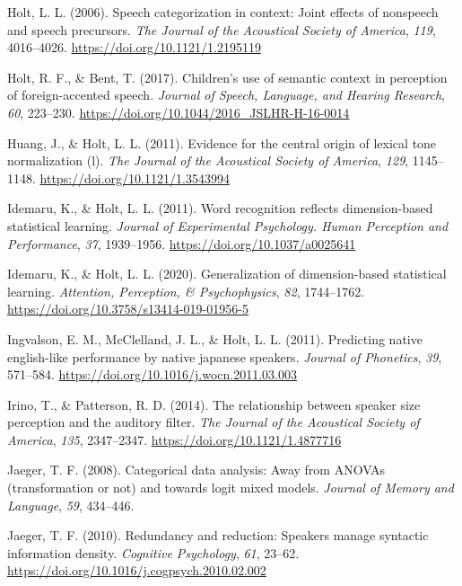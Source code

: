 \documentclass[
  11pt,
  english,
  man,floatsintext]{apa6}
\newlength{\cslhangindent}
\newlength{\cslentryspacingunit} %
\newenvironment{CSLReferences}[2] %
 {%
  \setlength{\parindent}{0pt}
  \ifodd #1
  \let\oldpar\par
  \def\par{\hangindent=\cslhangindent\oldpar}
  \fi
  \setlength{\parskip}{#2\cslentryspacingunit}
 }%
 {}
\begin{document}
\begin{CSLReferences}{1}{0}
\leavevmode{}%
Holt, L. L. (2006). Speech categorization in context: Joint effects of nonspeech and speech precursors. \emph{The Journal of the Acoustical Society of America}, \emph{119}, 4016--4026. \url{https://doi.org/10.1121/1.2195119}

\leavevmode{}%
Holt, R. F., \& Bent, T. (2017). Children's use of semantic context in perception of foreign-accented speech. \emph{Journal of Speech, Language, and Hearing Research}, \emph{60}, 223--230. \url{https://doi.org/10.1044/2016_JSLHR-H-16-0014}

\leavevmode{}%
Huang, J., \& Holt, L. L. (2011). Evidence for the central origin of lexical tone normalization (l). \emph{The Journal of the Acoustical Society of America}, \emph{129}, 1145--1148. \url{https://doi.org/10.1121/1.3543994}

\leavevmode{}%
Idemaru, K., \& Holt, L. L. (2011). Word recognition reflects dimension-based statistical learning. \emph{Journal of Experimental Psychology. Human Perception and Performance}, \emph{37}, 1939--1956. \url{https://doi.org/10.1037/a0025641}

\leavevmode{}%
Idemaru, K., \& Holt, L. L. (2020). Generalization of dimension-based statistical learning. \emph{Attention, Perception, \& Psychophysics}, \emph{82}, 1744--1762. \url{https://doi.org/10.3758/s13414-019-01956-5}

\leavevmode{}%
Ingvalson, E. M., McClelland, J. L., \& Holt, L. L. (2011). Predicting native english-like performance by native japanese speakers. \emph{Journal of Phonetics}, \emph{39}, 571--584. \url{https://doi.org/10.1016/j.wocn.2011.03.003}

\leavevmode{}%
Irino, T., \& Patterson, R. D. (2014). The relationship between speaker size perception and the auditory filter. \emph{The Journal of the Acoustical Society of America}, \emph{135}, 2347--2347. \url{https://doi.org/10.1121/1.4877716}

\leavevmode{}%
Jaeger, T. F. (2008). Categorical data analysis: Away from ANOVAs (transformation or not) and towards logit mixed models. \emph{Journal of Memory and Language}, \emph{59}, 434--446.

\leavevmode{}%
Jaeger, T. F. (2010). Redundancy and reduction: Speakers manage syntactic information density. \emph{Cognitive Psychology}, \emph{61}, 23--62. \url{https://doi.org/10.1016/j.cogpsych.2010.02.002}


\end{CSLReferences}
\end{document}
